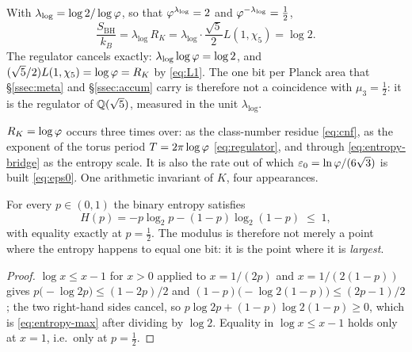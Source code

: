 \begin{theorem}\label{thm:entropy-bridge}
With $\lambda_{\log}=\log2/\log\varphi$, so that $\varphi^{\lambda_{\log}}=2$ and
$\varphi^{-\lambda_{\log}}=\tfrac12$,
\begin{equation}\label{eq:entropy-bridge}
  \frac{S_{\mathrm{BH}}}{k_B}
  =\lambda_{\log}\,R_K
  =\lambda_{\log}\cdot\frac{\sqrt5}{2}L(1,\chi_5)
  =\log 2 .
\end{equation}
The regulator cancels exactly: $\lambda_{\log}\log\varphi=\log2$, and
$(\sqrt5/2)L(1,\chi_5)=\log\varphi=R_K$ by \eqref{eq:L1}. The one bit per Planck area that
\S\ref{ssec:meta} and \S\ref{ssec:accum} carry is therefore not a coincidence with $\mu_3=\tfrac12$:
it is the regulator of $\mathbb{Q}(\sqrt5)$, measured in the unit $\lambda_{\log}$.


\end{theorem}

\begin{remark}\label{rmk:regulator-roles}
$R_K=\log\varphi$ occurs three times over: as the class-number residue \eqref{eq:cnf}, as the
exponent of the torus period $T=2\pi\log\varphi$ \eqref{eq:regulator}, and through
\eqref{eq:entropy-bridge} as the entropy scale. It is also the rate out of which
$\varepsilon_0=\ln\varphi/(6\sqrt3)$ is built \eqref{eq:eps0}. One arithmetic invariant of $K$,
four appearances.
\end{remark}

\begin{proposition}\label{entropy_max_at_half}
For every $p\in(0,1)$ the binary entropy satisfies
\begin{equation}\label{eq:entropy-max}
  H(p)=-p\log_2p-(1-p)\log_2(1-p)\;\le\;1,
\end{equation}
with equality exactly at $p=\tfrac12$. The modulus is therefore not merely a point where the
entropy happens to equal one bit: it is the point where it is \emph{largest}.


\end{proposition}
\begin{proof}
$\log x\le x-1$ for $x>0$ applied to $x=1/(2p)$ and $x=1/(2(1-p))$ gives
$p\bigl(-\log 2p\bigr)\le(1-2p)/2$ and $(1-p)\bigl(-\log 2(1-p)\bigr)\le(2p-1)/2$; the two
right-hand sides cancel, so $p\log 2p+(1-p)\log 2(1-p)\ge0$, which is \eqref{eq:entropy-max} after
dividing by $\log2$. Equality in $\log x\le x-1$ holds only at $x=1$, i.e.\ only at $p=\tfrac12$.
\end{proof}

